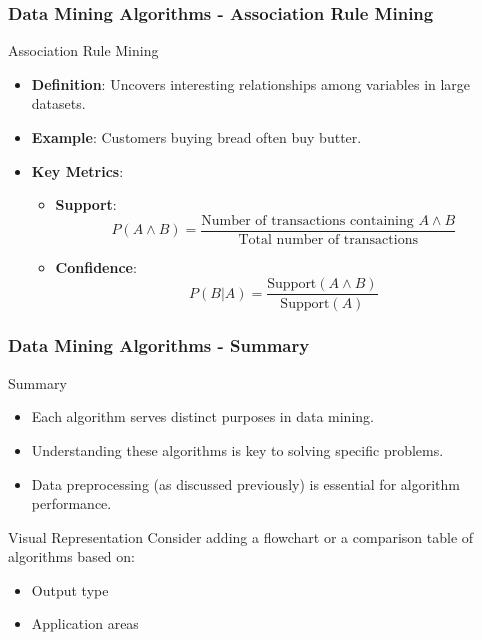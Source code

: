 \documentclass{beamer}
\begin{document}
\begin{frame}[fragile]
    \frametitle{Data Mining Algorithms - Association Rule Mining}
    \begin{block}{Association Rule Mining}
        \begin{itemize}
            \item \textbf{Definition}: Uncovers interesting relationships among variables in large datasets.
            \item \textbf{Example}: Customers buying bread often buy butter.
            \item \textbf{Key Metrics}:
            \begin{itemize}
                \item \textbf{Support}:
                \begin{equation}
                    P(A \land B) = \frac{\text{Number of transactions containing } A \land B}{\text{Total number of transactions}}
                \end{equation}
                \item \textbf{Confidence}:
                \begin{equation}
                    P(B|A) = \frac{\text{Support}(A \land B)}{\text{Support}(A)}
                \end{equation}
            \end{itemize}
        \end{itemize}
    \end{block}
\end{frame}

\begin{frame}[fragile]
    \frametitle{Data Mining Algorithms - Summary}
    \begin{block}{Summary}
        \begin{itemize}
            \item Each algorithm serves distinct purposes in data mining.
            \item Understanding these algorithms is key to solving specific problems.
            \item Data preprocessing (as discussed previously) is essential for algorithm performance.
        \end{itemize}
    \end{block}
    \begin{block}{Visual Representation}
        Consider adding a flowchart or a comparison table of algorithms based on:
        \begin{itemize}
            \item Output type
            \item Application areas
        \end{itemize}
    \end{block}
\end{frame}
\end{document}
